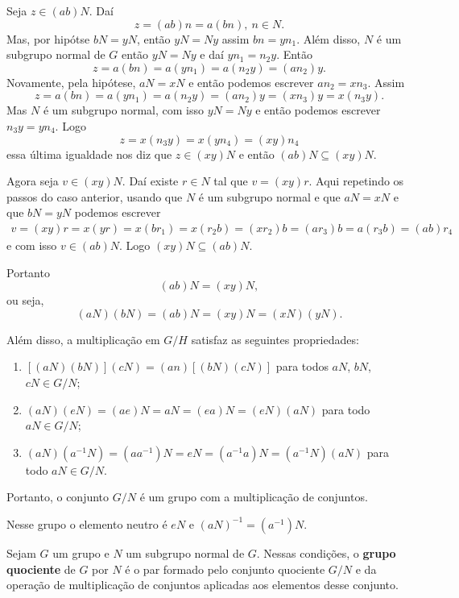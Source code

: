 Seja $z \in (ab)N$. Daí
\[
    z = (ab)n = a(bn),\ n \in N.
\]
Mas, por hipótse $bN = yN$, então $yN = Ny$ assim $bn = yn_1$. Além disso, $N$ é um subgrupo normal de $G$ então $yN = Ny$ e daí $yn_1 = n_2y$. Então
\[
    z = a(bn) = a(yn_1) = a(n_2y) = (an_2)y.
\]
Novamente, pela hipótese, $aN = xN$ e então podemos escrever $an_2 = xn_3$. Assim
\[
    z = a(bn) = a(yn_1) = a(n_2y) = (an_2)y = (xn_3)y = x(n_3y).
\]
Mas $N$ é um subgrupo normal, com isso $yN = Ny$ e então podemos escrever $n_3y = yn_4$. Logo
\[
    z = x(n_3y) = x(yn_4) = (xy)n_4
\]
essa \'ultima igualdade nos diz que $z \in (xy)N$ e então $(ab)N \subseteq (xy)N$.

Agora seja $v \in (xy)N$. Daí existe $r \in N$ tal que $v = (xy)r$. Aqui repetindo os passos do caso anterior, usando que $N$ é um subgrupo normal e que $aN = xN$ e que $bN = yN$ podemos escrever
\begin{align*}
    v = (xy)r = x(yr) = x(br_1) = x(r_2b) = (xr_2)b = (ar_3)b = a(r_3b) = (ab)r_4
\end{align*}
e com isso $v \in (ab)N$. Logo $(xy)N \subseteq (ab)N$.

Portanto
\[
    (ab)N = (xy)N,
\]
ou seja,
\[
    (aN)(bN) = (ab)N = (xy)N = (xN)(yN).
\]

Além disso, a multiplicação em $G/H$ satisfaz as seguintes propriedades:

\begin{enumerate}[label={\roman*})]
    \item $[(aN)(bN)](cN) = (an)[(bN)(cN)]$ para todos $aN$, $bN$, $cN \in G/N$;

    \item $(aN)(eN) = (ae)N = aN = (ea)N = (eN)(aN)$ para todo $aN \in G/N$;

    \item $(aN)(a^{-1}N) = (aa^{-1})N = eN = (a^{-1}a)N = (a^{-1}N)(aN)$ para todo $aN \in G/N$.
\end{enumerate}

Portanto, o conjunto $G/N$ é um grupo com a multiplicação de conjuntos.

Nesse grupo o elemento neutro é $eN$ e $(aN)^{-1} = (a^{-1})N$.

\begin{definicao}
    Sejam $G$ um grupo e $N$ um subgrupo normal de $G$. Nessas condições, o \textbf{grupo quociente}
    de $G$ por $N$ é o par formado pelo conjunto quociente $G/N$ e da operação de multiplicação de conjuntos
    aplicadas aos elementos desse conjunto.
\end{definicao}

